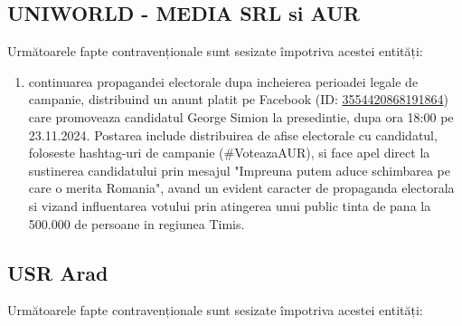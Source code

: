 \documentclass[a4paper,12pt]{article}
\begin{document}
\vspace{0.5cm}

\subsection{UNIWORLD - MEDIA SRL si AUR}
Următoarele fapte contravenționale sunt sesizate împotriva acestei entități:

\begin{enumerate}[leftmargin=*, label=\arabic*.)]
    \item continuarea propagandei electorale dupa incheierea perioadei legale de campanie, distribuind un anunt platit pe Facebook (ID: \href{https://www.facebook.com/ads/library/?id=3554420868191864}{3554420868191864}) care promoveaza candidatul George Simion la presedintie, dupa ora 18:00 pe 23.11.2024. Postarea include distribuirea de afise electorale cu candidatul, foloseste hashtag-uri de campanie (\#VoteazaAUR), si face apel direct la sustinerea candidatului prin mesajul "Impreuna putem aduce schimbarea pe care o merita Romania", avand un evident caracter de propaganda electorala si vizand influentarea votului prin atingerea unui public tinta de pana la 500.000 de persoane in regiunea Timis.
\end{enumerate}

\vspace{0.5cm}

\subsection{USR Arad}
Următoarele fapte contravenționale sunt sesizate împotriva acestei entități:
\end{document}
